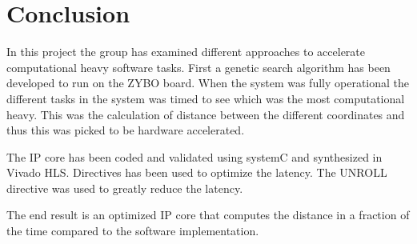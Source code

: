 
\chapter{Conclusion}
In this project the group has examined different approaches to accelerate computational heavy software tasks. First a genetic search algorithm has been developed to run on the ZYBO board. When the system was fully operational the different tasks in the system was timed to see which was the most computational heavy. This was the calculation of distance between the different coordinates and thus this was picked to be hardware accelerated. 

The IP core has been coded and validated using systemC and synthesized in Vivado HLS. Directives has been used to optimize the latency. The UNROLL directive was used to greatly reduce the latency.

The end result is an optimized IP core that computes the distance in a fraction of the time compared to the software implementation.
